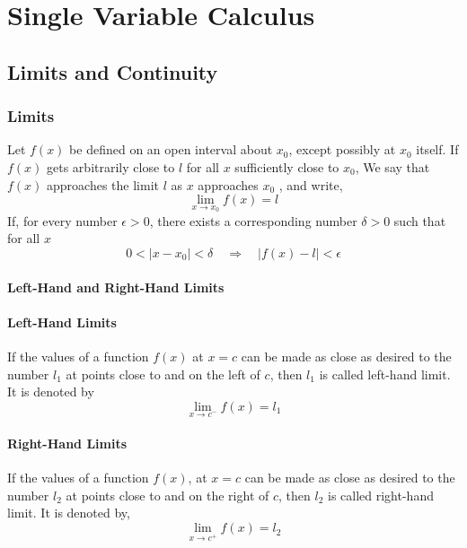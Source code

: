\chapter{  Single Variable Calculus}
\section{Limits and Continuity}
\subsection{Limits}
\begin{definition}
	Let $f(x)$ be defined on an open interval about $x_{0}$, except possibly at $x_{0}$ itself. If $f(x)$ gets arbitrarily close to $l$ for all $x$ sufficiently close to $x_{0}$,  We say that $f(x)$ approaches  the limit $l$   as $x$ approaches $x_{0}$ , and write,
	$$
	\lim _{x \rightarrow x_{0}} f(x)=l
	$$
	If, for every number $\epsilon>0$, there exists a corresponding number $\delta>0$ such that for all $x$
	$$
	0<\left|x-x_{0}\right|<\delta \quad \Rightarrow \quad|f(x)-l|<\epsilon
	$$
\end{definition}


\subsubsection{Left-Hand and Right-Hand Limits}
\subsubsection{Left-Hand Limits}
If the values of a function $f(x)$ at $x=c$ can be made as close as desired to the number $l_{1}$ at points close to and on the left of $c$, then $l_{1}$ is called left-hand limit. It is denoted by
$$
\lim _{x \rightarrow c^{-}} f(x)=l_{1}
$$
\subsubsection{Right-Hand Limits}
If the values of a function $f(x)$, at $x=c$ can be made as close as desired to the number $l_{2}$ at points close to and on the right of   $c$, then $l_{2}$ is called right-hand limit.  It is denoted by,
$$
\lim _{x \rightarrow c^{+}} f(x)=l_{2}
$$
